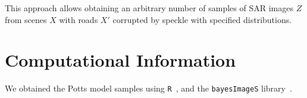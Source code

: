 \documentclass[journal]{IEEEtran}
\begin{document}
This approach allows obtaining an arbitrary number of samples of SAR images $Z$ from scenes $X$ with roads $X'$ corrupted by speckle with specified distributions.

\appendix

\section{Computational Information}

We obtained the Potts model samples using 
\verb|R|~\cite{R}, and
the \verb|bayesImageS| library~\cite{ScalableBayesianInferencefortheInverseTemperatureofaHiddenPottsModel2018}.



\end{document}
